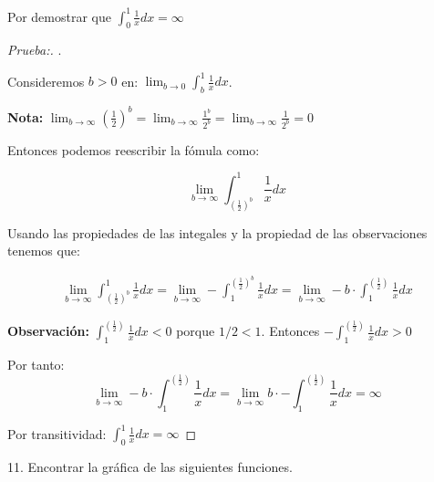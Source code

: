 \documentclass[12pt]{article}
\begin{document}
Por demostrar que \(\displaystyle\int_0^1\frac{1}{x}dx = \infty\)

\begin{proof}[Prueba:]
    . \medskip

    Consideremos $b>0$ en: \(\displaystyle\lim_{b\to0}\int_b^1\frac{1}{x}dx\).\medskip

    \textbf{Nota:} \(\displaystyle\lim_{b\to\infty}\left(\frac{1}{2}\right)^b = \lim_{b\to\infty} \frac{1^b}{2^b} = \lim_{b\to\infty} \frac{1}{2^b} = 0\)\bigskip

    Entonces podemos reescribir la f\'omula como:

    \[\lim_{b\to\infty}\int_{\left(\frac{1}{2}\right)^b}^1\frac{1}{x}dx\]

    Usando las propiedades de las integales y la propiedad de las observaciones tenemos que:

    \begin{align*}
        \lim_{b\to\infty}\int_{\left(\frac{1}{2}\right)^b}^1\frac{1}{x}dx = \lim_{b\to\infty}-\int^{\left(\frac{1}{2}\right)^b}_1\frac{1}{x}dx = \lim_{b\to\infty}-b\cdot\int^{\left(\frac{1}{2}\right)}_1\frac{1}{x}dx
    \end{align*}

    \textbf{Observaci\'on:} \(\displaystyle\int^{\left(\frac{1}{2}\right)}_1\frac{1}{x}dx <0\) porque \(1/2<1\). Entonces \(\displaystyle-\int^{\left(\frac{1}{2}\right)}_1\frac{1}{x}dx >0\)\bigskip

    Por tanto:
    \[\lim_{b\to\infty}-b\cdot \int^{\left(\frac{1}{2}\right)}_1\frac{1}{x}dx  = \lim_{b\to\infty}b\cdot -\int^{\left(\frac{1}{2}\right)}_1\frac{1}{x}dx = \infty\]

    Por transitividad: \qquad \(\displaystyle\int_0^1\frac{1}{x}dx = \infty\)\medskip

\end{proof}

11. Encontrar la gr\'afica de las siguientes funciones.
\end{document}
